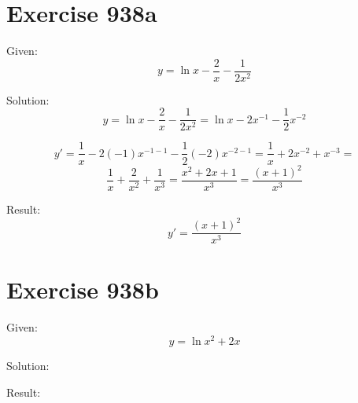 \documentclass[a4paper, 10pt]{scrartcl}
\begin{document}
\section{Exercise 938a}

Given:
\[
y = \ln{x} - \frac{2}{x} - \frac{1}{2x^{2}}
\]

Solution:
\[
y = \ln{x} - \frac{2}{x} - \frac{1}{2x^{2}} = \ln{x} - 2x^{-1} - \frac{1}{2}x^{-2}
\]

\[
y' = \frac{1}{x} - 2(-1)x^{-1 - 1} - \frac{1}{2}(-2)x^{-2 - 1} = \frac{1}{x} + 2x^{-2} + x^{-3} =
\]
\[
\frac{1}{x} + \frac{2}{x^{2}} + \frac{1}{x^{3}} = \frac{x^{2} + 2x + 1}{x^{3}} = \frac{(x + 1)^{2}}{x^{3}}
\]

Result:
\[
y' = \frac{(x + 1)^{2}}{x^{3}}
\]

\section{Exercise 938b}

Given:
\[
y = \ln{x^{2} + 2x}
\]

Solution:

Result:
\end{document}
